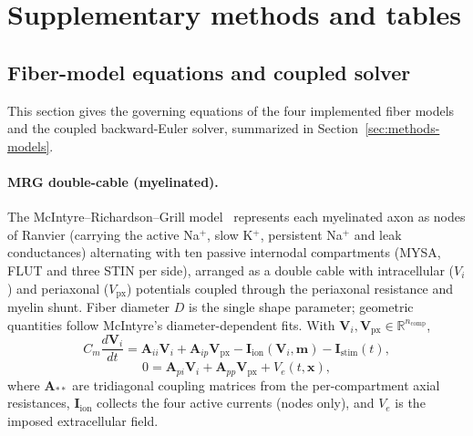 \clearpage
\setcounter{table}{0}
\renewcommand{\thetable}{S\arabic{table}}
\section*{Supplementary methods and tables}

\subsection*{Fiber-model equations and coupled solver}
\label{sec:app-equations}

This section gives the governing equations of the four implemented
fiber models and the coupled backward-Euler solver, summarized in
Section~\ref{sec:methods-models}.

\paragraph{MRG double-cable (myelinated).}
The McIntyre--Richardson--Grill model~\cite{mcintyre2002} represents
each myelinated axon as nodes of Ranvier (carrying the active Na$^+$,
slow K$^+$, persistent Na$^+$ and leak conductances) alternating with
ten passive internodal compartments (MYSA, FLUT and three STIN per
side), arranged as a double cable with intracellular ($V_i$) and
periaxonal ($V_{\mathrm{px}}$) potentials coupled through the
periaxonal resistance and myelin shunt.  Fiber diameter $D$ is the
single shape parameter; geometric quantities follow McIntyre's
diameter-dependent fits.  With
$\mathbf{V}_i, \mathbf{V}_{\mathrm{px}} \in \mathbb{R}^{n_{\mathrm{comp}}}$,
\begin{equation}
  C_m \frac{d\mathbf{V}_i}{dt} = \mathbf{A}_{ii} \mathbf{V}_i +
  \mathbf{A}_{ip} \mathbf{V}_{\mathrm{px}} - \mathbf{I}_{\mathrm{ion}}(\mathbf{V}_i, \mathbf{m}) -
  \mathbf{I}_{\mathrm{stim}}(t),
  \label{eq:cable-vi}
\end{equation}
\begin{equation}
  0 = \mathbf{A}_{pi} \mathbf{V}_i + \mathbf{A}_{pp} \mathbf{V}_{\mathrm{px}} + V_e(t,\mathbf{x}),
  \label{eq:cable-vpx}
\end{equation}
where $\mathbf{A}_{**}$ are tridiagonal coupling matrices from the
per-compartment axial resistances, $\mathbf{I}_{\mathrm{ion}}$ collects
the four active currents (nodes only), and $V_e$ is the imposed
extracellular field.


